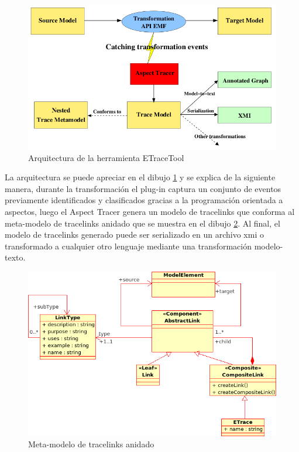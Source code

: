 \documentclass[a4paper,12pt,oneside,spanish]{book}
\begin{document}
\begin{figure}[hbtp]
\centering
\includegraphics[scale=0.5]{./img/ETraceTool_Arquitectura}
\caption{Arquitectura de la herramienta ETraceTool}
\label{fig:ArqETraceTool}
\end{figure}

La arquitectura se puede apreciar en el dibujo \ref{fig:ArqETraceTool} y se explica de la siguiente manera, durante la transformación el plug-in captura un conjunto de eventos previamente identificados y clasificados gracias a la programación orientada a aspectos, luego el Aspect Tracer genera un modelo de tracelinks que conforma al meta-modelo de tracelinks anidado que se muestra en el dibujo \ref{fig:ETraceToolMeta-modelo}. Al final, el modelo de tracelinks generado puede ser serializado en un archivo \gls{xmi} o transformado a cualquier otro lenguaje mediante una transformación modelo-texto.

\begin{figure}[hbtp]
\centering
\includegraphics[scale=0.6]{./img/NestedTraceMetamodel}
\caption{Meta-modelo de tracelinks anidado}
\label{fig:ETraceToolMeta-modelo}
\end{figure}
\end{document}
